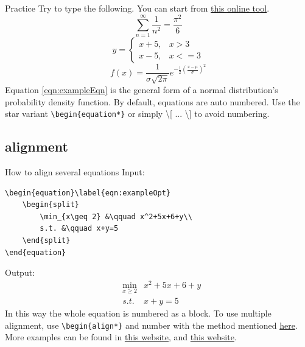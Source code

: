 \documentclass [xcolor=svgnames, t] {beamer}
\begin{document}
\begin{frame}[fragile]{Practice}
    Try to type the following. You can start from \href{https://latexeditor.lagrida.com/}{this online tool}.
    \[ \sum_{n=1}^\infty \frac{1}{n^2}= \frac{\pi^2}{6}\]
    \begin{equation*}
        y=\begin{cases}
            x+5, & x>3\\
            x-5, & x<=3
        \end{cases}
    \end{equation*}
    \begin{equation} \label{eqn:exampleEqn}
        f(x) = \frac{1}{\sigma \sqrt{2\pi}} e^{-\frac{1}{2}\left(\frac{x-\mu}{\sigma}\right)^2}
    \end{equation}
    Equation \eqref{eqn:exampleEqn} is the general form of a normal distribution's probability density function. By default, equations are auto numbered. Use the star variant \verb|\begin{equation*}| or simply \textbackslash[ ... \textbackslash] to avoid numbering.
\end{frame}

\subsection{alignment}
\begin{frame}[fragile]{How to align several equations}
    \vspace{-0.5em}
    Input:\\
    \vspace{-0.2em}
    \begin{lstlisting}
\begin{equation}\label{eqn:exampleOpt}
    \begin{split}
        \min_{x\geq 2} &\qquad x^2+5x+6+y\\
        s.t. &\qquad x+y=5
    \end{split}
\end{equation}\end{lstlisting}
    \vspace{-0.2em}
    Output:
    \vspace{-0.2em}
    \begin{equation}\label{eqn:exampleOpt}
        \begin{aligned}
            &\min_{x\geq 2} & x^2+5x+6+y\\
            &s.t. & x+y=5
        \end{aligned}
    \end{equation}
    \vspace{-0.2em}
    In this way the whole equation is numbered as a block. To use multiple alignment, use \verb|\begin{align*}| and number with the method mentioned \href{https://tex.stackexchange.com/a/42728}{here}.  More examples can be found in \href{https://docs.aspose.com/tex/java/latex-structures-for-equations/}{this website}, and \href{https://en.wikibooks.org/wiki/LaTeX/Advanced_Mathematics#Vertically_aligning_displayed_mathematics}{this website}.
\end{frame}
\end{document}
